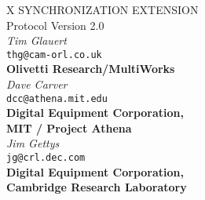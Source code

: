 %
%
%


\setlength{\parindent}{0 pt}
\setlength{\parskip}{6pt}

\newcommand{\system}[1]{{\sc #1}}
\newcommand{\request}[1]{{\bf #1}}
\newcommand{\event}[1]{{\bf #1}}

\newcommand{\param}[1]{{\it #1}}
\newcommand{\error}[1]{{\bf #1}}
\newcommand{\enum}[1]{{\bf #1}}

\newcommand{\eventdef}[1]{\item \event{#1}}
\newcommand{\requestdef}[1]{\item \request{#1}}
\newcommand{\errordef}[1]{\item \error{#1}}
\newcommand{\systemdef}[1]{\item \system{#1}}

\newcommand{\defn}[1]{{\bf #1}}



\begin{center}

{\large X SYNCHRONIZATION EXTENSION}\\[10pt]
{\large Protocol Version 2.0}\\[15pt]
{\it Tim Glauert}\\[0pt]
{\tt thg@cam-orl.co.uk}\\[0pt]
{\bf Olivetti Research/MultiWorks}\\[5pt]
{\it Dave Carver}\\[0pt]
{\tt dcc@athena.mit.edu}\\[0pt]
{\bf Digital Equipment Corporation,}\\[0pt]
{\bf MIT / Project Athena}\\[5pt]
{\it Jim Gettys}\\[0pt]
{\tt jg@crl.dec.com}\\[0pt]
{\bf Digital Equipment Corporation,}\\[0pt]
{\bf Cambridge Research Laboratory}\\[5pt]

\end {center}

